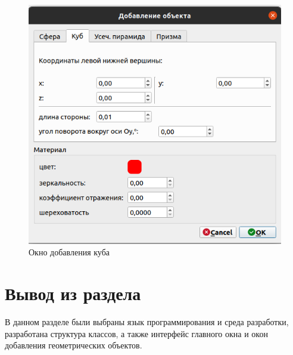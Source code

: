 \begin{figure}[H]
	\begin{center}
		\includegraphics[scale=0.5]{assets/int2.png}
	\end{center}
	\caption{Окно добавления куба}
	\label{int2}
\end{figure}

\section{Вывод из раздела}

В данном разделе были выбраны язык программирования и среда разработки, разработана структура классов, а также интерфейс главного окна и окон добавления геометрических объектов.